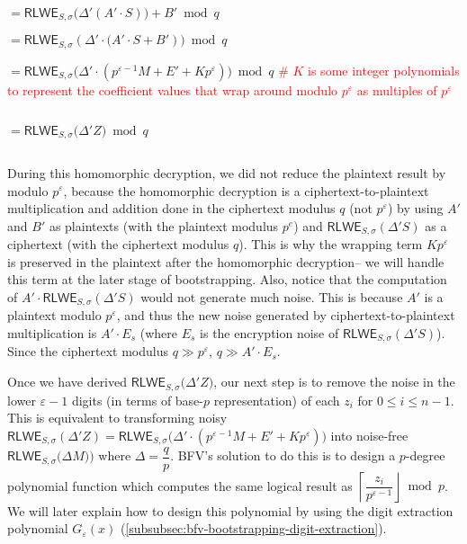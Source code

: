 $= \textsf{RLWE}_{S, \sigma}\bm(\Delta' (A' \cdot S)\bm) + B' \bmod q$

$= \textsf{RLWE}_{S, \sigma}(\Delta' \cdot \bm(A'\cdot S + B')\bm) \bmod q$

$ = \textsf{RLWE}_{S, \sigma}\bm(\Delta' \cdot (p^{\varepsilon-1} M  + E' + Kp^\varepsilon)\bm) \bmod q$ \textcolor{red}{ \# $K$ is some integer polynomials to represent the coefficient values that wrap around modulo $p^\varepsilon$ as multiples of $p^\varepsilon$}

$ $

$ = \textsf{RLWE}_{S, \sigma}\bm(\Delta' Z\bm) \bmod q$

$ $

During this homomorphic decryption, we did not reduce the plaintext result by modulo $p^\varepsilon$, because the homomorphic decryption is a ciphertext-to-plaintext multiplication and addition done in the ciphertext modulus $q$ (not $p^{\varepsilon}$) by using $A'$ and $B'$ as plaintexts (with the plaintext modulus $p^e$) and $\textsf{RLWE}_{S, \sigma}(\Delta' S)$ as a ciphertext (with the ciphertext modulus $q$). This is why the wrapping term $Kp^\varepsilon$ is preserved in the plaintext after the homomorphic decryption-- we will handle this term at the later stage of bootstrapping. Also, notice that the computation of $A'\cdot \textsf{RLWE}_{S, \sigma}(\Delta' S)$ would not generate much noise. This is because $A'$ is a plaintext modulo $p^\varepsilon$, and thus the new noise generated by ciphertext-to-plaintext multiplication is $A' \cdot E_s$ (where $E_s$ is the encryption noise of $\textsf{RLWE}_{S, \sigma}(\Delta' S)$). Since the ciphertext modulus $q \gg p^\varepsilon$, $q \gg A' \cdot E_s$. 

Once we have derived $\textsf{RLWE}_{S, \sigma}\bm(\Delta' Z\bm)$, our next step is to remove the noise in the lower $\varepsilon-1$ digits (in terms of base-$p$ representation) of each $z_i$ for $0 \leq i \leq n - 1$. This is equivalent to transforming noisy $\textsf{RLWE}_{S, \sigma}(\Delta' Z) = \textsf{RLWE}_{S, \sigma}\bm(\Delta' \cdot (p^{\varepsilon-1} M  + E' + Kp^\varepsilon)\bm)$ into noise-free $\textsf{RLWE}_{S, \sigma}\bm (\Delta M)\bm )$ where $\Delta = \dfrac{q}{p}$. BFV's solution to do this is to design a $p$-degree polynomial function which computes the same logical result as $\left\lceil \dfrac{z_i}{p^{\varepsilon-1}} \right\rfloor \bmod p$. We will later explain how to design this polynomial by using the digit extraction polynomial $G_\varepsilon(x)$ (\autoref{subsubsec:bfv-bootstrapping-digit-extraction}). 


